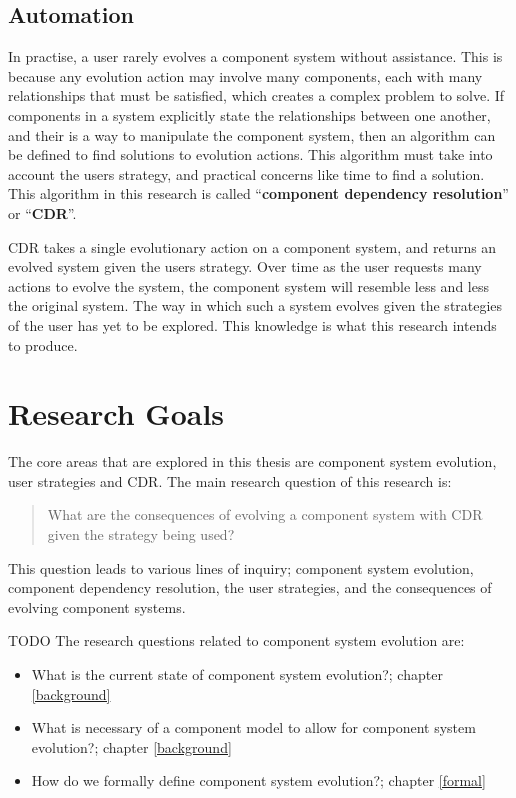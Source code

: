 \subsection{Automation}
In practise, a user rarely evolves a component system without assistance.
This is because any evolution action may involve many components, each with many relationships that must be satisfied, which creates a complex problem to solve.
If components in a system explicitly state the relationships between one another, and their is a way to manipulate the component system,
then an algorithm can be defined to find solutions to evolution actions.
This algorithm must take into account the users strategy, and practical concerns like time to find a solution.
This algorithm in this research is called ``\textbf{component dependency resolution}'' or ``\textbf{CDR}''.

CDR takes a single evolutionary action on a component system, and returns an evolved system given the users strategy.
Over time as the user requests many actions to evolve the system, the component system will resemble less and less the original system.
The way in which such a system evolves given the strategies of the user has yet to be explored. 
This knowledge is what this research intends to produce. 

\section{Research Goals}
The core areas that are explored in this thesis are component system evolution, user strategies and CDR.
The main research question of this research is:
\begin{quote}
What are the consequences of evolving a component system with CDR given the strategy being used?
\end{quote}

This question leads to various lines of inquiry; component system evolution, component dependency resolution, the user strategies, and the consequences of evolving component systems.

TODO
The research questions related to component system evolution are:
\begin{itemize}
	\item What is the current state of component system evolution?; chapter \ref{background}
	\item What is necessary of a component model to allow for component system evolution?; chapter \ref{background}
	\item How do we formally define component system evolution?; chapter \ref{formal}
\end{itemize}


